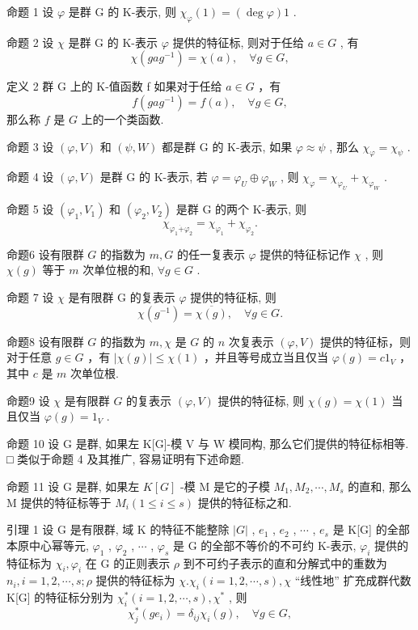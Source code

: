 \documentclass[]{article}
\begin{document}
命题 1 设 $\varphi$ 是群 G 的 K-表示, 则 $\chi_{\varphi}(1)=(\deg\varphi)1$ . 

命题 2 设 $\chi$ 是群 G 的 K-表示 $\varphi$ 提供的特征标, 则对于任给 $a \in G$ , 有$$
\chi (g a g ^ {- 1}) = \chi (a), \quad \forall g \in G, 
$$

定义 2 群 G 上的 K-值函数 f 如果对于任给 $a \in G$ ，有$$
f (g a g ^ {- 1}) = f (a), \quad \forall g \in G,
$$那么称 $f$ 是 $G$ 上的一个类函数. 

命题 3 设 $(\varphi, V)$ 和 $(\psi, W)$ 都是群 G 的 K-表示, 如果 $\varphi \approx \psi$ , 那么 $\chi_{\varphi} = \chi_{\psi}$ . 

命题 4 设 $(\varphi, V)$ 是群 G 的 K-表示, 若 $\varphi = \varphi_{U} \oplus \varphi_{W}$ , 则 $\chi_{\varphi} = \chi_{\varphi_{U}} + \chi_{\varphi_{W}}$ . 

命题 5 设 $(\varphi_{1}, V_{1})$ 和 $(\varphi_{2}, V_{2})$ 是群 G 的两个 K-表示, 则   $$
\chi_ {\varphi_ {1} \dot {+} \varphi_ {2}} = \chi_ {\varphi_ {1}} + \chi_ {\varphi_ {2}}.
$$

命题6 设有限群 $G$ 的指数为 $m, G$ 的任一复表示 $\varphi$ 提供的特征标记作 $\chi$ , 则 $\chi(g)$ 等于 $m$ 次单位根的和, $\forall g \in G$ . 

命题 7 设 $\chi$ 是有限群 G 的复表示 $\varphi$ 提供的特征标, 则$$
\chi (g ^ {- 1}) = \overline {{{{\chi (g)}}}}, \quad \forall g \in G.
$$

命题8 设有限群 $G$ 的指数为 $m, \chi$ 是 $G$ 的 $n$ 次复表示 $(\varphi, V)$ 提供的特征标，则对于任意 $g \in G$ ，有 $|\chi(g)| \leqslant \chi(1)$ ，并且等号成立当且仅当 $\varphi(g) = c1_V$ ，其中 $c$ 是 $m$ 次单位根. 

命题9 设 $\chi$ 是有限群 $G$ 的复表示 $(\varphi, V)$ 提供的特征标, 则 $\chi(g) = \chi(1)$ 当且仅当 $\varphi(g) = 1_V$ .

命题 10 设 G 是群, 如果左 K[G]-模 V 与 W 模同构, 那么它们提供的特征标相等. □ 类似于命题 4 及其推广, 容易证明有下述命题.  

命题 11 设 G 是群, 如果左 $K[G]$ -模 M 是它的子模 $M_{1}, M_{2}, \cdots, M_{s}$ 的直和, 那么 M 提供的特征标等于 $M_{i} (1 \leqslant i \leqslant s)$ 提供的特征标之和.  

引理 1 设 G 是有限群, 域 K 的特征不能整除 $|G|$ , $e_{1}$ , $e_{2}$ , $\cdots$ , $e_{s}$ 是 K[G] 的全部本原中心幂等元, $\varphi_{1}$ , $\varphi_{2}$ , $\cdots$ , $\varphi_{s}$ 是 G 的全部不等价的不可约 K-表示, $\varphi_{i}$ 提供的特征标为 $\chi_{i}, \varphi_{i}$ 在 G 的正则表示 $\rho$ 到不可约子表示的直和分解式中的重数为 $n_{i}, i = 1, 2, \cdots, s; \rho$ 提供的特征标为 $\chi. \chi_{i} (i = 1, 2, \cdots, s), \chi$ “线性地” 扩充成群代数 K[G] 的特征标分别为 $\chi_{i}^{*} (i = 1, 2, \cdots, s), \chi^{*}$ , 则 $$
\chi_ {j} ^ {*} (g e _ {i}) = \delta_ {i j} \chi_ {i} (g), \quad \forall g \in G, 
$$
\end{document}
